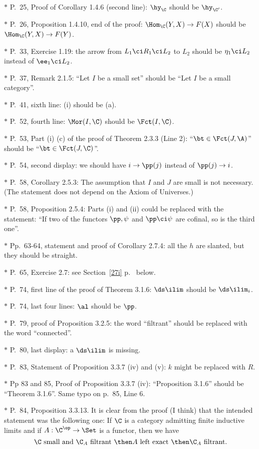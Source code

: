 \documentclass[12pt]{article}
\theoremstyle{remark}
\theoremstyle{definition}
\begin{document}
\nn$*$ P.~25, Proof of Corollary 1.4.6 (second line): $\hy_\C$ should be $\hy_{\C'}$.

\nn$*$ P.~26, Proposition 1.4.10, end of the proof: $\Hom_\C(Y,X)\to F(X)$ should be $\Hom_\C(Y,X)\to F(Y)$. 

\nn$*$ P.~33, Exercise 1.19: the arrow from $L_1\ci R_1\ci L_2$ to $L_2$ should be $\eta_1\ci L_2$ instead of $\ee_1\ci L_2$. 

\nn$*$ P.~37, Remark 2.1.5: ``Let $I$ be a small set'' should be ``Let $I$ be a small category''.

\nn$*$ P.~41, sixth line: (i) should be (a). 

\nn$*$ P.~52, fourth line: $\Mor(I,\C)$ should be $\Fct(I,\C)$.

\nn$*$ P.~53, Part (i) (c) of the proof of Theorem 2.3.3 (Line 2): ``$\bt\in\Fct(J,\A)$'' should be ``$\bt\in\Fct(J,\C)$''.

\nn$*$ P.~54, second display: we should have $i\to\pp(j)$ instead of $\pp(j)\to i$.

\nn$*$ P.~58, Corollary 2.5.3: The assumption that $I$ and $J$ are small is not necessary. (The statement does not depend on the Axiom of Universes.) 

\nn$*$ P.~58, Proposition 2.5.4: Parts (i) and (ii) could be replaced with the statement: ``If two of the functors $\pp,\psi$ and $\pp\ci\psi$ are cofinal, so is the third one''.

\nn$*$ Pp.~63-64, statement and proof of Corollary 2.7.4: all the $h$ are slanted, but they should be straight.

\nn$*$ P.~65, Exercise 2.7: see Section~\ref{27i} p.~ below.

\nn$*$ P.~74, first line of the proof of Theorem 3.1.6: $\ds\ilim$ should be $\ds\ilim_i$. 

\nn$*$ P.~74, last four lines: $\al$ should be $\pp$.

\nn$*$ P.~79, proof of Proposition 3.2.5: the word ``filtrant'' should be replaced with the word ``connected''.

\nn$*$ P.~80, last display: a $\ds\ilim$ is missing.

\nn$*$ P.~83, Statement of Proposition 3.3.7 (iv) and (v): $k$ might be replaced with $R$. 

\nn$*$ Pp 83 and 85, Proof of Proposition 3.3.7 (iv): ``Proposition 3.1.6'' should be ``Theorem 3.1.6''. Same typo on p.~85, Line 6.

\nn$*$ P.~84, Proposition 3.3.13. It is clear from the proof (I think) that the intended statement was the following one: If $\C$ is a category admitting finite inductive limits and if $A:\C^{\op}\to\Set$ is a functor, then we have 
$$
\C\text{ small and }\C_A\text{ filtrant }\then A\text{ left exact }\then\C_A\text{ filtrant}.
$$
\end{document}
